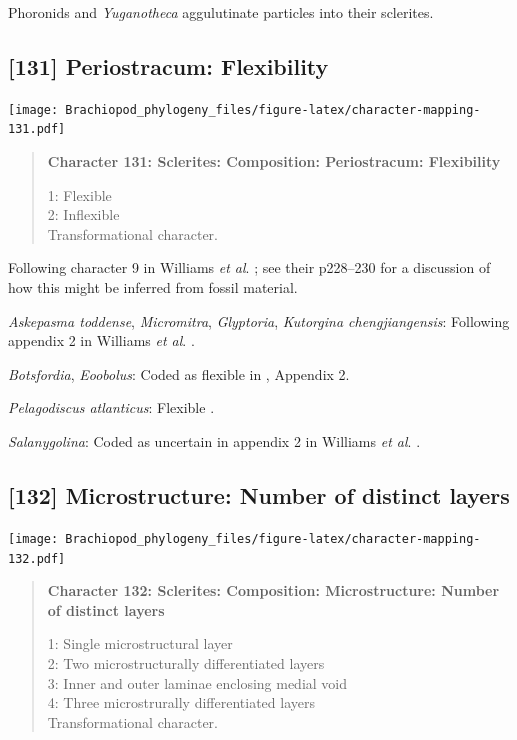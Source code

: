 \documentclass[openany]{book}
\begin{document}
Phoronids and \emph{Yuganotheca} aggulutinate particles into their
sclerites.

\subsection*{{[}131{]} Periostracum:
Flexibility}\label{periostracum-flexibility}

\texttt{[image: Brachiopod\_phylogeny\_files/figure-latex/character-mapping-131.pdf]}

\begin{quote}
\textbf{Character 131: Sclerites: Composition: Periostracum:
Flexibility}

1: Flexible\\
2: Inflexible\\
Transformational character.
\end{quote}

Following character 9 in Williams \emph{et al}.
\citeyearpar{Williams1998Thediversity}; see their p228--230 for a
discussion of how this might be inferred from fossil material.

\hypertarget{Askepasma_toddense-coding-131}{}
\emph{Askepasma toddense}, \emph{Micromitra}, \emph{Glyptoria},
\emph{Kutorgina chengjiangensis}: Following appendix 2 in Williams
\emph{et al}. \citeyearpar{Williams1998Thediversity}.

\hypertarget{Botsfordia-coding-131}{}
\emph{Botsfordia}, \emph{Eoobolus}: Coded as flexible in
\citet{Williams1998Thediversity}, Appendix 2.

\hypertarget{Pelagodiscus_atlanticus-coding-131}{}
\emph{Pelagodiscus atlanticus}: Flexible
\citep{Williams1998Thediversity}.

\hypertarget{Salanygolina-coding-131}{}
\emph{Salanygolina}: Coded as uncertain in appendix 2 in Williams
\emph{et al}. \citeyearpar{Williams1998Thediversity}.

\subsection*{{[}132{]} Microstructure: Number of distinct
layers}\label{microstructure-number-of-distinct-layers}

\texttt{[image: Brachiopod\_phylogeny\_files/figure-latex/character-mapping-132.pdf]}

\begin{quote}
\textbf{Character 132: Sclerites: Composition: Microstructure: Number of
distinct layers}

1: Single microstructural layer\\
2: Two microstructurally differentiated layers\\
3: Inner and outer laminae enclosing medial void\\
4: Three microstrurally differentiated layers\\
Transformational character.
\end{quote}
\end{document}
